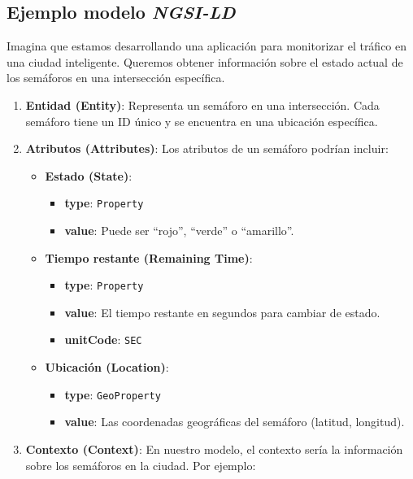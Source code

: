 \subsection{Ejemplo modelo \textit{NGSI-LD}}\label{ejemplo-uso-ngsi}
Imagina que estamos desarrollando una aplicación para monitorizar el tráfico en una ciudad inteligente. Queremos obtener información sobre el estado actual de los semáforos en una intersección específica.

\begin{enumerate}
    \item \textbf{Entidad (Entity)}: Representa un semáforo en una intersección. Cada semáforo tiene un ID único y se encuentra en una ubicación específica.
    \item \textbf{Atributos (Attributes)}: Los atributos de un semáforo podrían incluir:
        \begin{itemize}
            \item \textbf{Estado (State)}: 
                \begin{itemize}
                    \item \textbf{type}: \texttt{Property}
                    \item \textbf{value}: Puede ser “rojo”, “verde” o “amarillo”.
                \end{itemize}
            \item \textbf{Tiempo restante (Remaining Time)}: 
                \begin{itemize}
                    \item \textbf{type}: \texttt{Property}
                    \item \textbf{value}: El tiempo restante en segundos para cambiar de estado.
                    \item \textbf{unitCode}: \texttt{SEC}
                \end{itemize}
            \item \textbf{Ubicación (Location)}: 
                \begin{itemize}
                    \item \textbf{type}: \texttt{GeoProperty}
                    \item \textbf{value}: Las coordenadas geográficas del semáforo (latitud, longitud).
                \end{itemize}
        \end{itemize}
    \item \textbf{Contexto (Context)}: En nuestro modelo, el contexto sería la información sobre los semáforos en la ciudad. Por ejemplo:

\end{enumerate}
